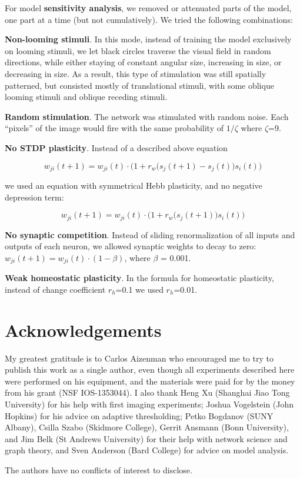 \documentclass{article}
\begin{document}
For model \textbf{sensitivity analysis}, we removed or attenuated parts of the model, one part at a time (but not cumulatively). We tried the following combinations:

\textbf{Non-looming stimuli}. In this mode, instead of training the model exclusively on looming stimuli, we let black circles traverse the visual field in random directions, while either staying of constant angular size, increasing in size, or decreasing in size. As a result, this type of stimulation was still spatially patterned, but consisted mostly of translational stimuli, with some oblique looming stimuli and oblique receding stimuli.

\textbf{Random stimulation}. The network was stimulated with random noise. Each “pixels” of the image would fire with the same probability of $1/\zeta$ where $\zeta$=9.

\textbf{No STDP plasticity}. Instead of a described above equation 

\[ w_{ji}(t+1) = w_{ji}(t)\cdot\Big(1+r_w\big(s_j(t+1)-s_j(t)\big)s_i(t)\Big) \]

we used an equation with symmetrical Hebb plasticity, and no negative depression term: 

\[ w_{ji}(t+1) = w_{ji}(t)\cdot\Big(1+r_w\big(s_j(t+1)\big)s_i(t)\Big) \]

\textbf{No synaptic competition}. Instead of sliding renormalization of all inputs and outputs of each neuron, we allowed synaptic weights to decay to zero: $w_{ji}(t+1) = w_{ji}(t)\cdot (1-\beta)$, where $\beta$ = 0.001.

\textbf{Weak homeostatic plasticity}. In the formula for homeostatic plasticity, instead of change coefficient $r_h$=0.1 we used $r_h$=0.01.

\section*{Acknowledgements}

My greatest gratitude is to Carlos Aizenman who encouraged me to try to publish this work as a single author, even though all experiments described here were performed on his equipment, and the materials were paid for by the money from his grant (NSF IOS-1353044). I also thank Heng Xu (Shanghai Jiao Tong University) for his help with first imaging experiments; Joshua Vogelstein (John Hopkins) for his advice on adaptive thresholding; Petko Bogdanov (SUNY Albany), Csilla Szabo (Skidmore College), Gerrit Ansmann (Bonn University), and Jim Belk (St Andrews University) for their help with network science and graph theory, and Sven Anderson (Bard College) for advice on model analysis.


The authors have no conflicts of interest to disclose.

\nolinenumbers


\end{document}
